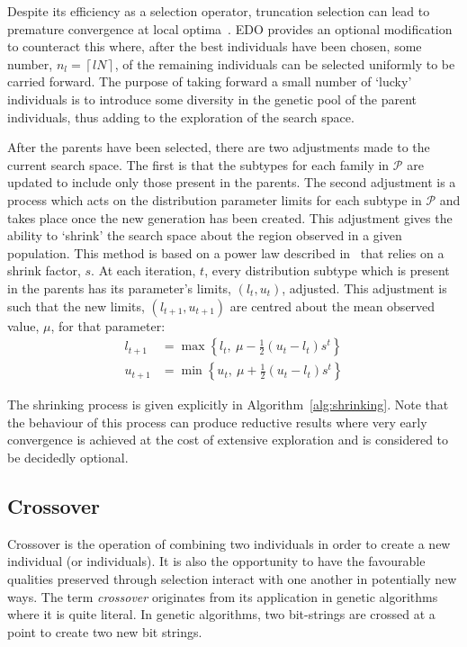 Despite its efficiency as a selection operator, truncation selection can lead to
premature convergence at local optima~\cite{Jebari2013,Motoki2002}. EDO provides
an optional modification to counteract this where, after the best individuals
have been chosen, some number, \(n_l = \left\lceil l N\right\rceil\), of the
remaining individuals can be selected uniformly to be carried forward. The
purpose of taking forward a small number of `lucky' individuals is to introduce
some diversity in the genetic pool of the parent individuals, thus adding to the
exploration of the search space.

After the parents have been selected, there are two adjustments made to the
current search space. The first is that the subtypes for each family in
\(\mathcal{P}\) are updated to include only those present in the parents. The
second adjustment is a process which acts on the distribution parameter limits
for each subtype in \(\mathcal{P}\) and takes place once the new generation has
been created. This adjustment gives the ability to `shrink' the search space
about the region observed in a given population. This method is based on a power
law described in~\cite{Amirjanov2016} that relies on a shrink factor, \(s\). At
each iteration, \(t\), every distribution subtype which is present in the
parents has its parameter's limits, \(\left(l_t, u_t\right)\), adjusted. This
adjustment is such that the new limits, \(\left(l_{t+1}, u_{t+1}\right)\) are
centred about the mean observed value, \(\mu\), for that parameter:
\begin{align}
    \label{eq:shrinking_lower}
    l_{t+1}&= \max \left\{l_t, \ \mu - \frac{1}{2} (u_t - l_t) s^t\right\}\\
    \label{eq:shrinking_upper}
    u_{t+1}&= \min \left\{u_t, \ \mu + \frac{1}{2} (u_t - l_t) s^t\right\}
\end{align}

The shrinking process is given explicitly in
Algorithm~\ref{alg:shrinking}. Note that the behaviour of this process can
produce reductive results where very early convergence is achieved at the cost
of extensive exploration and is considered to be decidedly optional.



\subsection{Crossover}

Crossover is the operation of combining two individuals in order to create a new
individual (or individuals). It is also the opportunity to have the favourable
qualities preserved through selection interact with one another in potentially
new ways. The term \emph{crossover} originates from its application in genetic
algorithms where it is quite literal. In genetic algorithms, two bit-strings are
crossed at a point to create two new bit strings.

